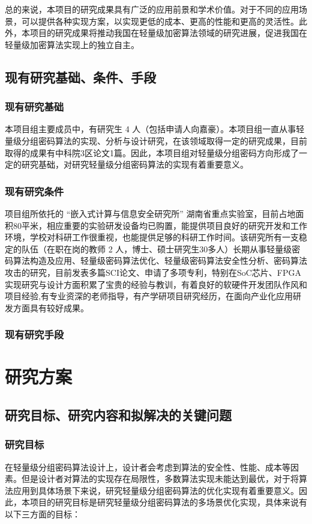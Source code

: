 \documentclass{ctexart}
\begin{document}
总的来说，本项目的研究成果具有广泛的应用前景和学术价值。对于不同的应用场景，可以提供各种实现方案，以实现更低的成本、更高的性能和更高的灵活性。此外，本项目的研究成果将推动我国在轻量级加密算法领域的研究进展，促进我国在轻量级加密算法实现上的独立自主。

\subsection{现有研究基础、条件、手段}
\subsubsection{现有研究基础}
本项目组主要成员中，有研究生 4 人（包括申请人向嘉豪）。本项目组一直从事轻量级分组密码算法的实现、分析与设计研究，在该领域取得一定的研究成果，目前取得的成果有中科院3区论文1篇。因此，本项目组对轻量级分组密码方向形成了一定的研究基础，对研究轻量级分组密码算法的实现有着重要意义。
\subsubsection{现有研究条件}
项目组所依托的 “嵌入式计算与信息安全研究所” 湖南省重点实验室，目前占地面积80平米，相应重要的实验研发设备均已购置，能提供项目良好的研究开发和工作环境，学校对科研工作很重视，也能提供足够的科研工作时间。该研究所有一支稳定的队伍（在职在岗的教师 2 人，博士、硕士研究生30多人）长期从事轻量级密码算法构造及应用、轻量级密码算法优化、轻量级密码算法安全性分析、密码算法攻击的研究，目前发表多篇SCI论文、申请了多项专利，特别在SoC芯片、FPGA实现研究与设计方面积累了宝贵的经验与教训，有着良好的软硬件开发团队作风和项目经验,有专业资深的老师指导，有产学研项目研究经历，在面向产业化应用研发方面具有较好成果。

\subsubsection{现有研究手段}


\section{研究方案}
\subsection{研究目标、研究内容和拟解决的关键问题}
\subsubsection{研究目标}
在轻量级分组密码算法设计上，设计者会考虑到算法的安全性、性能、成本等因素。但是设计者对算法的实现存在局限性，多数算法实现未能达到最优，对于将算法应用到具体场景下来说，研究轻量级分组密码算法的优化实现有着重要意义。因此，本项目的研究目标是研究轻量级分组密码算法的多场景优化实现，具体来说有以下三方面的目标：
\end{document}
